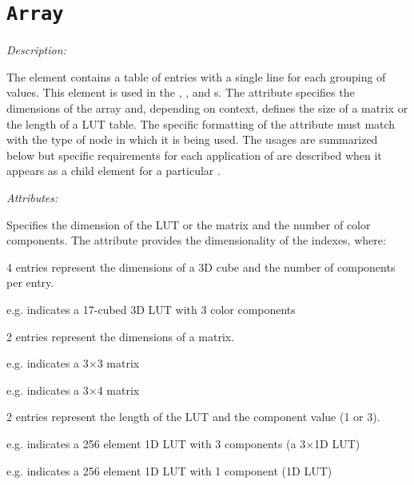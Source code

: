 \section{\texttt{Array}} \label{sec:array}
\emph{Description:} \par
The  element contains a table of entries with a single line for each grouping of values. This element is used in the , , and  s. The  attribute specifies the dimensions of the array and, depending on context, defines the size of a matrix or the length of a LUT table. The specific formatting of the  attribute must match with the type of node in which it is being used. The usages are summarized below but specific requirements for each application of  are described when it appears as a child element for a particular .

\emph{Attributes:}
\begin{xmlfields}
    \xmlitem[dim][required]     Specifies the dimension of the LUT or the matrix and the number of color components. The  attribute provides the dimensionality of the indexes, where:

        4 entries represent the dimensions of a 3D cube and the number of components per entry.
        \begin{list}{}{\setlength{\itemsep}{4pt}\setlength{\topsep}{0pt}}
                \item e.g.  indicates a 17-cubed 3D LUT with 3 color components
        \end{list}

        2 entries represent the dimensions of a matrix.
        \begin{list}{}{\setlength{\itemsep}{4pt}\setlength{\topsep}{0pt}}
                \item e.g.  indicates a 3$\times$3 matrix
                \item e.g.  indicates a 3$\times$4 matrix
        \end{list}

        2 entries represent the length of the LUT and the component value (1 or 3).
        \begin{list}{}{\setlength{\itemsep}{4pt}\setlength{\topsep}{0pt}}
                \item e.g.  indicates a 256 element 1D LUT with 3 components (a 3$\times$1D LUT)
                \item e.g.  indicates a 256 element 1D LUT with 1 component (1D LUT)
        \end{list}
\end{xmlfields}